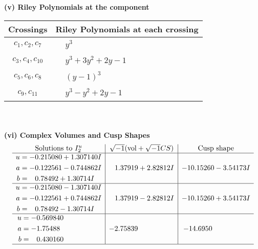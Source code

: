 \documentclass[1p]{elsarticle_modified}
\theoremstyle{definition}
\newcommand{\I}{\sqrt{-1}}
\begin{document}
\flushleft \textbf{(v) Riley Polynomials at the component}\newline \\
\begin{tabular}{m{50pt}|m{274pt}}
Crossings & \hspace{64pt}Riley Polynomials at each crossing \\
\hline $$\begin{aligned}c_{1},c_{2},c_{7}\end{aligned}$$&$\begin{aligned}
&y^3
\end{aligned}$\\
\hline $$\begin{aligned}c_{3},c_{4},c_{10}\end{aligned}$$&$\begin{aligned}
&y^3+3 y^2+2 y-1
\end{aligned}$\\
\hline $$\begin{aligned}c_{5},c_{6},c_{8}\end{aligned}$$&$\begin{aligned}
&(y-1)^3
\end{aligned}$\\
\hline $$\begin{aligned}c_{9},c_{11}\end{aligned}$$&$\begin{aligned}
&y^3- y^2+2 y-1
\end{aligned}$\\
\hline
\end{tabular}\\~\\
\newpage\flushleft \textbf{(vi) Complex Volumes and Cusp Shapes}
$$\begin{array}{c|c|c}  
\text{Solutions to }I^u_{2}& \I (\text{vol} + \sqrt{-1}CS) & \text{Cusp shape}\\
 \hline 
\begin{aligned}
u &= -0.215080 + 1.307140 I \\
a &= -0.122561 - 0.744862 I \\
b &= \phantom{-}0.78492 + 1.30714 I\end{aligned}
 & \phantom{-}1.37919 + 2.82812 I & -10.15260 - 3.54173 I \\ \hline\begin{aligned}
u &= -0.215080 - 1.307140 I \\
a &= -0.122561 + 0.744862 I \\
b &= \phantom{-}0.78492 - 1.30714 I\end{aligned}
 & \phantom{-}1.37919 - 2.82812 I & -10.15260 + 3.54173 I \\ \hline\begin{aligned}
u &= -0.569840\phantom{ +0.000000I} \\
a &= -1.75488\phantom{ +0.000000I} \\
b &= \phantom{-}0.430160\phantom{ +0.000000I}\end{aligned}
 & -2.75839\phantom{ +0.000000I} & -14.6950\phantom{ +0.000000I}\\
 \hline 
 \end{array}$$\newpage
\end{document}
